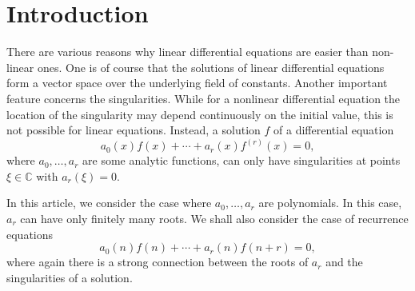 \documentclass{sig-alternate}
\newcommand{\bC} { {\mathbb{C}}}
\begin{document}
\section{Introduction}\label{SECT:intro}
There are various reasons why linear differential equations are
easier than non-linear ones. One is of course that the solutions
of linear differential equations form a vector space over the
underlying field of constants. Another important feature concerns
the singularities. While for a nonlinear differential equation
the location of the singularity may depend continuously on the
initial value, this is not possible for linear
equations. Instead, a solution $f$ of a differential equation
\[
  a_0(x)f(x) + \cdots + a_r(x)f^{(r)}(x) = 0,
\]
where $a_0,\dots,a_r$ are some analytic functions, can only have
singularities at points $\xi \in \bC$ with $a_r(\xi)=0$.

In this article, we consider the case where $a_0,\dots,a_r$ are
polynomials. In this case, $a_r$ can have only finitely many
roots.  We shall also consider the case of recurrence equations
\[
  a_0(n)f(n) + \cdots + a_r(n)f(n+r)=0,
\]
where again there is a strong connection between the roots of
$a_r$ and the singularities of a solution.
\end{document}
